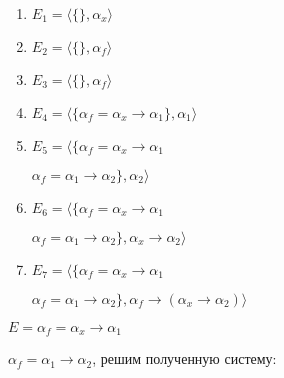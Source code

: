 \begin{enumerate}
	\item $E_1=\big \langle \{\}, \alpha_x \big \rangle$
	\item $E_2=\big \langle \{\}, \alpha_f \big \rangle$
	\item $E_3=\big \langle \{\}, \alpha_f \big \rangle$
	\item $E_4=\big \langle \{\alpha_f=\alpha_x\rightarrow\alpha_1\}, \alpha_1 \big \rangle$
	\item $E_5=\big \langle \{\alpha_f=\alpha_x\rightarrow\alpha_1$\par$\alpha_f=\alpha_1\rightarrow\alpha_2\}, \alpha_2 \big \rangle$
	\item $E_6=\big \langle \{\alpha_f=\alpha_x\rightarrow\alpha_1$\par$\alpha_f=\alpha_1\rightarrow\alpha_2\}, \alpha_x\rightarrow\alpha_2 \big \rangle$
	\item $E_7=\big \langle \{\alpha_f=\alpha_x\rightarrow\alpha_1$\par$\alpha_f=\alpha_1\rightarrow\alpha_2\}, \alpha_f\rightarrow(\alpha_x\rightarrow\alpha_2) \big \rangle$
\end{enumerate}
	$E=\alpha_f=\alpha_x\rightarrow\alpha_1$\par$\alpha_f=\alpha_1\rightarrow\alpha_2$, решим полученную систему:\par 

